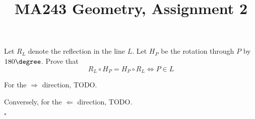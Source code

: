 \documentclass[a4paper]{article}
\title{MA243 Geometry, Assignment 2}
\begin{document}
\maketitle

\setlength{\parindent}{0em}
\setlength{\parskip}{1em}


\begin{questionbody}
%
Let $R_L$ denote the reflection in the line $L$. Let $H_P$ be the rotation through $P$ by $180\degree$. Prove that \[
R_L \circ H_P = H_P \circ R_L \iff P \in L
\]
\end{questionbody}

For the $\Rightarrow$ direction, TODO\@.

Conversely, for the $\Leftarrow$ direction, TODO\@.

\hfill $\square$


\end{document}
